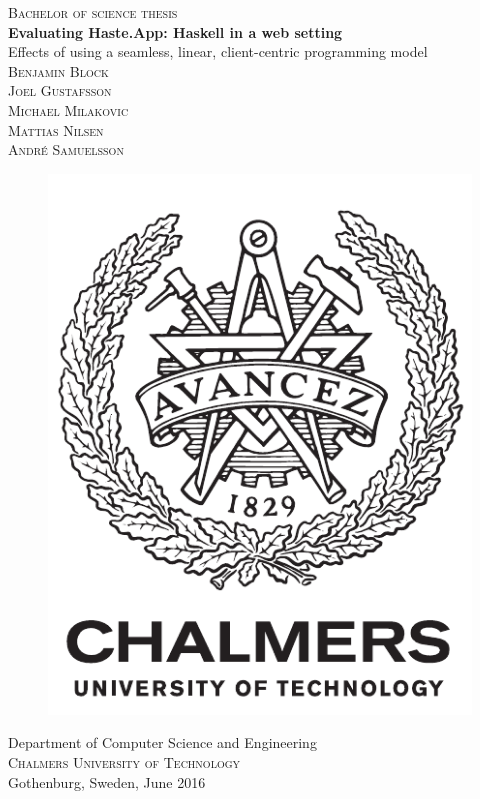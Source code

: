 \documentclass[a4paper]{article}
\begin{document}
\newpage
\thispagestyle{empty}
\begin{center}
	\textsc{\large Bachelor of science thesis}\\[4cm]
	\textbf{\Large Evaluating Haste.App: Haskell in a web setting} \\[1cm]
	{\large Effects of using a seamless, linear, client-centric programming model}\\[1cm]
    {\Large \textsc{Benjamin Block}} \setlength{\parskip}{2.9cm}\\
    {\Large \textsc{Joel Gustafsson}} \setlength{\parskip}{2.9cm}\\
    {\Large \textsc{Michael Milakovic}} \setlength{\parskip}{2.9cm}\\
    {\Large \textsc{Mattias Nilsen}} \setlength{\parskip}{2.9cm}\\
    {\Large \textsc{André Samuelsson}} \setlength{\parskip}{2.9cm}
	
	\vfill	
	\begin{figure}[H]
	\centering
	\includegraphics[width=0.2\pdfpagewidth]{figure/logo_eng.pdf} \\	
	\end{figure}	\vspace{5mm}	
	
	Department of Computer Science and Engineering \\
	
	\textsc{Chalmers University of Technology} \\
	Gothenburg, Sweden, June 2016 \\
\end{center}
\end{document}
